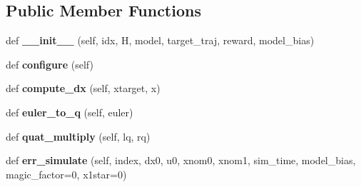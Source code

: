 \subsection*{Public Member Functions}
\begin{DoxyCompactItemize}
\item 
\hypertarget{classaml__lfd_1_1ilqr_1_1ilqr__traj__follow_1_1_d_d_p___traj_follow_class_af57153eec992c4d5aa913f5a260a85f3}{}\label{classaml__lfd_1_1ilqr_1_1ilqr__traj__follow_1_1_d_d_p___traj_follow_class_af57153eec992c4d5aa913f5a260a85f3} 
def {\bfseries \+\_\+\+\_\+init\+\_\+\+\_\+} (self, idx, H, model, target\+\_\+traj, reward, model\+\_\+bias)
\item 
\hypertarget{classaml__lfd_1_1ilqr_1_1ilqr__traj__follow_1_1_d_d_p___traj_follow_class_a0bb462b6c44f1947fd3da86d1f4a1127}{}\label{classaml__lfd_1_1ilqr_1_1ilqr__traj__follow_1_1_d_d_p___traj_follow_class_a0bb462b6c44f1947fd3da86d1f4a1127} 
def {\bfseries configure} (self)
\item 
\hypertarget{classaml__lfd_1_1ilqr_1_1ilqr__traj__follow_1_1_d_d_p___traj_follow_class_acfb1dce86855ce148b64a14681dced17}{}\label{classaml__lfd_1_1ilqr_1_1ilqr__traj__follow_1_1_d_d_p___traj_follow_class_acfb1dce86855ce148b64a14681dced17} 
def {\bfseries compute\+\_\+dx} (self, xtarget, x)
\item 
\hypertarget{classaml__lfd_1_1ilqr_1_1ilqr__traj__follow_1_1_d_d_p___traj_follow_class_adfbb659619cb79ee4daa822d04e60b7c}{}\label{classaml__lfd_1_1ilqr_1_1ilqr__traj__follow_1_1_d_d_p___traj_follow_class_adfbb659619cb79ee4daa822d04e60b7c} 
def {\bfseries euler\+\_\+to\+\_\+q} (self, euler)
\item 
\hypertarget{classaml__lfd_1_1ilqr_1_1ilqr__traj__follow_1_1_d_d_p___traj_follow_class_a4dd5e360ae2095a38ee4eed90b187db3}{}\label{classaml__lfd_1_1ilqr_1_1ilqr__traj__follow_1_1_d_d_p___traj_follow_class_a4dd5e360ae2095a38ee4eed90b187db3} 
def {\bfseries quat\+\_\+multiply} (self, lq, rq)
\item 
\hypertarget{classaml__lfd_1_1ilqr_1_1ilqr__traj__follow_1_1_d_d_p___traj_follow_class_ad8bc6029ca4b9893a9e7b323aa6f77f1}{}\label{classaml__lfd_1_1ilqr_1_1ilqr__traj__follow_1_1_d_d_p___traj_follow_class_ad8bc6029ca4b9893a9e7b323aa6f77f1} 
def {\bfseries err\+\_\+simulate} (self, index, dx0, u0, xnom0, xnom1, sim\+\_\+time, model\+\_\+bias, magic\+\_\+factor=0, x1star=0)
\item 
\hypertarget{classaml__lfd_1_1ilqr_1_1ilqr__traj__follow_1_1_d_d_p___traj_follow_class_a4c551b84c7303e7dd96894e802a12c48}{}\label{classaml__lfd_1_1ilqr_1_1ilqr__traj__follow_1_1_d_d_p___traj_follow_class_a4c551b84c7303e7dd96894e802a12c48} 

\end{DoxyCompactItemize}
